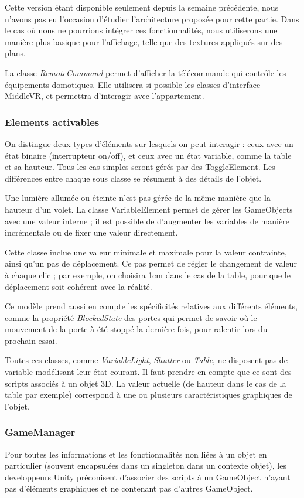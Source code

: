 Cette version étant disponible seulement depuis la semaine précédente, nous n'avons pas eu l'occasion d'étudier l'architecture proposée pour cette partie.
Dans le cas où nous ne pourrions intégrer ces fonctionnalités, nous utiliserons une manière plus basique pour l'affichage, telle que des textures appliqués sur des plans.

La classe \textit{RemoteCommand} permet d'afficher la télécommande qui contrôle les équipements domotiques. Elle utilisera si possible les classes d'interface MiddleVR, et permettra d'interagir avec l'appartement.


\subsubsection{Elements activables}
On distingue deux types d'éléments sur lesquels on peut interagir : ceux avec un état binaire (interrupteur on/off), et ceux avec un état variable, comme la table et sa hauteur. Tous les cas simples seront gérés par des ToggleElement. Les différences entre chaque sous classe se résument à des détails de l'objet.

Une lumière allumée ou éteinte n'est pas gérée de la même manière que la hauteur d'un volet. La classe VariableElement permet de gérer les GameObjects avec une valeur interne ; il est possible de d'augmenter les variables de manière incrémentale ou de fixer une valeur directement.

Cette classe inclue une valeur minimale et maximale pour la valeur contrainte, ainsi qu'un pas de déplacement. Ce pas permet de régler le changement de valeur à chaque clic ; par exemple, on choisira 1cm dans le cas de la table, pour que le déplacement soit cohérent avec la réalité.

Ce modèle prend aussi en compte les spécificités relatives aux différents éléments, comme la propriété \textit{BlockedState} des portes qui permet de savoir où le mouvement de la porte à été stoppé la dernière fois, pour ralentir lors du prochain essai.

Toutes ces classes, comme \textit{VariableLight}, \textit{Shutter} ou \textit{Table},  ne disposent pas de variable modélisant leur état courant. Il faut prendre en compte que ce sont des scripts associés à un objet 3D. La valeur actuelle (de hauteur dans le cas de la table par exemple) correspond à une ou plusieurs caractéristiques graphiques de l'objet.

\subsubsection{GameManager}
Pour toutes les informations et les fonctionnalités non liées à un objet en particulier (souvent encapsulées dans un singleton dans un contexte objet), les developpeurs Unity préconisent d'associer des scripts à un GameObject n'ayant pas d'éléments graphiques et ne contenant pas d'autres GameObject.

